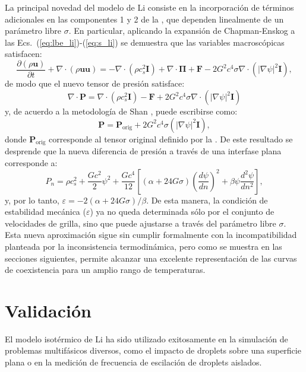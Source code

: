 La principal novedad del modelo de Li consiste en la incorporaci\'on de t\'erminos adicionales en las componentes 1 y 2 de la , que dependen linealmente de un par\'ametro libre $\sigma$. En particular, aplicando la expansi\'on de Chapman-Enskog a las Ecs.~(\ref{eq:lbe_li})-(\ref{eq:s_li}) se demuestra que las variables macrosc\'opicas satisfacen:
\begin{equation}
	\dfrac{\partial (\rho \bm{u})}{\partial t} + \nabla \cdot (\rho \bm{uu}) = -\nabla \cdot (\rho c_s^2 \bm{I}) + \nabla \cdot \bm{\Pi} + \bm{F} - 2G^2 c^4 \sigma \nabla \cdot (|\nabla \psi|^2 \bm{I}),
	\label{eq:li_macro}
\end{equation}
de modo que el nuevo tensor de presi\'on satisface:
\begin{equation}
	\nabla \cdot \bm{P} = \nabla \cdot (\rho c_s^2 \bm{I}) - \bm{F} + 2G^2 c^4 \sigma \nabla \cdot (|\nabla \psi|^2 \bm{I})
\end{equation}
y, de acuerdo a la metodolog\'ia de Shan \cite{shan_pressure_2008}, puede escribirse como:
\begin{equation}
	\bm{P} = \bm{P}_{\mbox{orig}} + 2G^2 c^4 \sigma (|\nabla \psi|^2 \bm{I}),
\end{equation}
donde $\bm{P}_{\mbox{orig}}$ corresponde al tensor original definido por la . De este resultado se desprende que la nueva diferencia de presi\'on a trav\'es de una interfase plana corresponde a:
\begin{equation}
	P_n = \rho c_s^2 + \dfrac{G c^2}{2} \psi^2 + \dfrac{G c^4}{12} \left[ (\alpha+24G\sigma) \left( \dfrac{d\psi}{dn} \right)^2 + \beta \psi \dfrac{d^2 \psi}{dn^2} \right],
\end{equation}
y, por lo tanto, $\varepsilon=-2(\alpha + 24 G \sigma)/\beta$. De esta manera, la condici\'on de estabilidad mec\'anica ($\varepsilon$) ya no queda determinada s\'olo por el conjunto de velocidades de grilla, sino que puede ajustarse a trav\'es del par\'ametro libre $\sigma$. Esta nueva aproximaci\'on sigue sin cumplir formalmente con la incompatibilidad planteada por la inconsistencia termodin\'amica, pero como se muestra en las secciones siguientes, permite alcanzar una excelente representaci\'on de las curvas de coexistencia para un amplio rango de temperaturas.


\section{Validaci\'on}

El modelo isot\'ermico de Li ha sido utilizado exitosamente en la simulaci\'on de problemas multif\'asicos diversos, como el impacto de droplets sobre una superficie plana o en la medici\'on de frecuencia de escilaci\'on de droplets aislados. 

